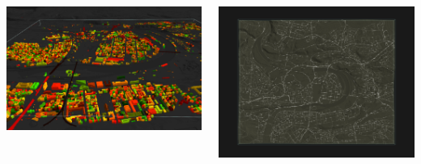 \documentclass[czech,xcolor={table}]{beamer}
\begin{document}
	\begin{frame}
		\begin{columns}
			\begin{column}{0.5\textwidth}
				\begin{center}
					\includegraphics[width=1\textwidth]{imgs/metacity0.png}
				\end{center}
			\end{column}
			\begin{column}{0.45\textwidth}
				\begin{center}
					\includegraphics[width=1\textwidth]{imgs/webPrototype2.png}
				\end{center}
			\end{column}
		\end{columns}	
	\end{frame}
\end{document}
